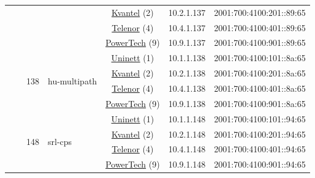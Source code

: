 \begin{small}
\begin{center}
\begin{longtable}{|c|c|c|c|c|c|c|c|}
  &  &  &  & \multicolumn{2}{|c|}{\tiny{\href{http://kvantel.no}{Kvantel} (2)}} & \tiny{10.2.1.137} & \tiny{2001:700:4100:201::89:65} \\* \cline{5-5}\cline{6-6}\cline{7-7}\cline{8-8}
  &  &  &  & \multicolumn{2}{|c|}{\tiny{\href{https://www.telenor.no}{Telenor} (4)}} & \tiny{10.4.1.137} & \tiny{2001:700:4100:401::89:65} \\* \cline{5-5}\cline{6-6}\cline{7-7}\cline{8-8}
  &  &  &  & \multicolumn{2}{|c|}{\tiny{\href{http://www.powertech.no}{PowerTech} (9)}} & \tiny{10.9.1.137} & \tiny{2001:700:4100:901::89:65} \\* \cline{3-3}\cline{4-4}\cline{5-5}\cline{6-6}\cline{7-7}\cline{8-8}
  &  & \multirow{4}{*}{\tiny{138}} & \multicolumn{1}{|l|}{\multirow{4}{*}{\tiny{hu-multipath}}} & \multicolumn{2}{|c|}{\tiny{\href{https://www.uninett.no}{Uninett} (1)}} & \tiny{10.1.1.138} & \tiny{2001:700:4100:101::8a:65} \\* \cline{5-5}\cline{6-6}\cline{7-7}\cline{8-8}
  &  &  &  & \multicolumn{2}{|c|}{\tiny{\href{http://kvantel.no}{Kvantel} (2)}} & \tiny{10.2.1.138} & \tiny{2001:700:4100:201::8a:65} \\* \cline{5-5}\cline{6-6}\cline{7-7}\cline{8-8}
  &  &  &  & \multicolumn{2}{|c|}{\tiny{\href{https://www.telenor.no}{Telenor} (4)}} & \tiny{10.4.1.138} & \tiny{2001:700:4100:401::8a:65} \\* \cline{5-5}\cline{6-6}\cline{7-7}\cline{8-8}
  &  &  &  & \multicolumn{2}{|c|}{\tiny{\href{http://www.powertech.no}{PowerTech} (9)}} & \tiny{10.9.1.138} & \tiny{2001:700:4100:901::8a:65} \\* \cline{3-3}\cline{4-4}\cline{5-5}\cline{6-6}\cline{7-7}\cline{8-8}
  &  & \multirow{4}{*}{\tiny{148}} & \multicolumn{1}{|l|}{\multirow{4}{*}{\tiny{srl-cps}}} & \multicolumn{2}{|c|}{\tiny{\href{https://www.uninett.no}{Uninett} (1)}} & \tiny{10.1.1.148} & \tiny{2001:700:4100:101::94:65} \\* \cline{5-5}\cline{6-6}\cline{7-7}\cline{8-8}
  &  &  &  & \multicolumn{2}{|c|}{\tiny{\href{http://kvantel.no}{Kvantel} (2)}} & \tiny{10.2.1.148} & \tiny{2001:700:4100:201::94:65} \\* \cline{5-5}\cline{6-6}\cline{7-7}\cline{8-8}
  &  &  &  & \multicolumn{2}{|c|}{\tiny{\href{https://www.telenor.no}{Telenor} (4)}} & \tiny{10.4.1.148} & \tiny{2001:700:4100:401::94:65} \\* \cline{5-5}\cline{6-6}\cline{7-7}\cline{8-8}
  &  &  &  & \multicolumn{2}{|c|}{\tiny{\href{http://www.powertech.no}{PowerTech} (9)}} & \tiny{10.9.1.148} & \tiny{2001:700:4100:901::94:65} \\* \cline{3-3}\cline{4-4}\cline{5-5}\cline{6-6}\cline{7-7}\cline{8-8}

\end{longtable}
\end{center}
\end{small}
